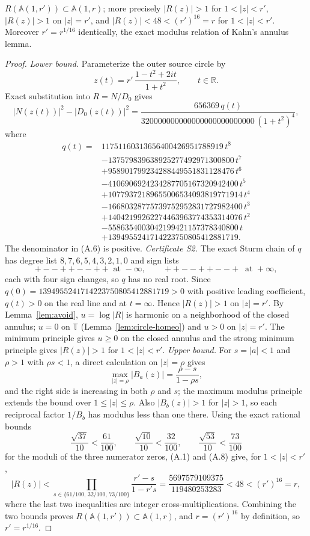\begin{lemma}\label{lem:containment}
\(R(\mathbb A(1,r'))\subset\mathbb A(1,r)\); more precisely \(|R(z)|>1\) for \(1<|z|<r'\), \(|R(z)|>1\) on \(|z|=r'\), and \(|R(z)|<48<(r')^{16}=r\) for \(1<|z|<r'\). Moreover \(r'=r^{1/16}\) identically, the exact modulus relation of Kahn's annulus lemma.
\end{lemma}

\begin{proof}
\emph{Lower bound.} Parameterize the outer source circle by
\[ z(t)=r'\,\frac{1-t^2+2it}{1+t^2},\qquad t\in\mathbb R. \]
Exact substitution into \(R=N/D_0\) gives
\[ |N(z(t))|^2-|D_0(z(t))|^2=\frac{656369\,q(t)}{320000000000000000000000000\,(1+t^2)^4}, \tag{A.6} \]
where
\[\begin{aligned} q(t)={}&11751160313656400426951788919\,t^{8}\\ &-137579839638925277492971300800\,t^{7}\\ &+958901799234288449551831128476\,t^{6}\\ &-4106906924234287705167320942400\,t^{5}\\ &+10779372189655006534093819771914\,t^{4}\\ &-16680328775739752952831727982400\,t^{3}\\ &+14042199262274463963774353314076\,t^{2}\\ &-5586354003042199421157378340800\,t\\ &+1394955241714223750805412881719. \end{aligned}\tag{A.7}\]
The denominator in (A.6) is positive. \emph{Certificate S2.} The exact Sturm chain of \(q\) has degree list \(8,7,6,5,4,3,2,1,0\) and sign lists
\[ +--++--++\ \text{ at } -\infty,\qquad ++--++--+\ \text{ at } +\infty, \]
each with four sign changes, so \(q\) has no real root. Since \(q(0)=1394955241714223750805412881719>0\) with positive leading coefficient, \(q(t)>0\) on the real line and at \(t=\infty\). Hence \(|R(z)|>1\) on \(|z|=r'\).
By Lemma~\ref{lem:avoid}, \(u=\log|R|\) is harmonic on a neighborhood of the closed annulus; \(u=0\) on \(\mathbb T\) (Lemma~\ref{lem:circle-homeo}) and \(u>0\) on \(|z|=r'\). The minimum principle gives \(u\ge0\) on the closed annulus and the strong minimum principle gives \(|R(z)|>1\) for \(1<|z|<r'\).
\emph{Upper bound.} For \(s=|a|<1\) and \(\rho>1\) with \(\rho s<1\), a direct calculation on \(|z|=\rho\) gives
\[ \max_{|z|=\rho}|B_a(z)|=\frac{\rho-s}{1-\rho s}, \tag{A.8} \]
and the right side is increasing in both \(\rho\) and \(s\); the maximum modulus principle extends the bound over \(1\le|z|\le\rho\). Also \(|B_b(z)|>1\) for \(|z|>1\), so each reciprocal factor \(1/B_b\) has modulus less than one there. Using the exact rational bounds
\[ \frac{\sqrt{37}}{10}<\frac{61}{100},\qquad \frac{\sqrt{10}}{10}<\frac{32}{100},\qquad \frac{\sqrt{53}}{10}<\frac{73}{100} \]
for the moduli of the three numerator zeros, (A.1) and (A.8) give, for \(1<|z|<r'\),
\[ |R(z)|<\prod_{s\in\{61/100,\,32/100,\,73/100\}}\frac{r'-s}{1-r's}=\frac{5697579109375}{119480253283}<48<(r')^{16}=r, \]
where the last two inequalities are integer cross-multiplications. Combining the two bounds proves \(R(\mathbb A(1,r'))\subset\mathbb A(1,r)\), and \(r=(r')^{16}\) by definition, so \(r'=r^{1/16}\).
\end{proof}